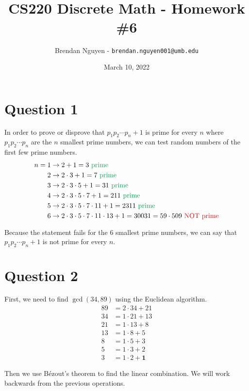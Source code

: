 \documentclass[11pt]{article}
\title{CS220 Discrete Math - Homework \#6}
\author{Brendan Nguyen - \texttt{brendan.nguyen001@umb.edu}}
\date{March 10, 2022}
\begin{document}
\maketitle

\section*{Question 1}
In order to prove or disprove that $p_{1}p_{2} \cdots p_n + 1$ is prime for every $n$ where $p_{1}p_{2} \cdots p_n$ are the $n$ smallest prime numbers, we can test random numbers of the first few prime numbers.
\begin{align*}
    n = 1 &\to 2 + 1 = 3 \text{ \textcolor{Green}{prime}}\\
    2 &\to 2 \cdot 3 + 1 = 7 \text{ \textcolor{Green}{prime}}\\
    3 &\to 2 \cdot 3 \cdot 5 + 1 = 31 \text{ \textcolor{Green}{prime}}\\
    4 &\to 2 \cdot 3 \cdot 5 \cdot 7 + 1 = 211 \text{ \textcolor{Green}{prime}}\\
    5 &\to 2 \cdot 3 \cdot 5 \cdot 7 \cdot 11 + 1 = 2311 \text{ \textcolor{Green}{prime}}\\
    6 &\to 2 \cdot 3 \cdot 5 \cdot 7 \cdot 11 \cdot 13 + 1 = 30031 = 59 \cdot 509 \text{ \textcolor{red}{NOT prime}}
\end{align*}

Because the statement fails for the 6 smallest prime numbers, we can say that $p_{1}p_{2} \cdots p_n + 1$ is not prime for every $n$.

\section*{Question 2}
First, we need to find $\gcd(34, 89)$ using the Euclidean algorithm.
\begin{align*}
    89 &= 2 \cdot 34 + 21\\
    34 &= 1 \cdot 21 + 13\\
    21 &= 1 \cdot 13 + 8\\
    13 &= 1 \cdot 8 + 5\\
    8 &= 1 \cdot 5 + 3\\
    5 &= 1 \cdot 3 + 2\\
    3 &= 1 \cdot 2 + \boxed{\mathbf{1}}
\end{align*}

Then we use B\'{e}zout's theorem to find the linear combination. We will work backwards from the previous operations.
\end{document}
